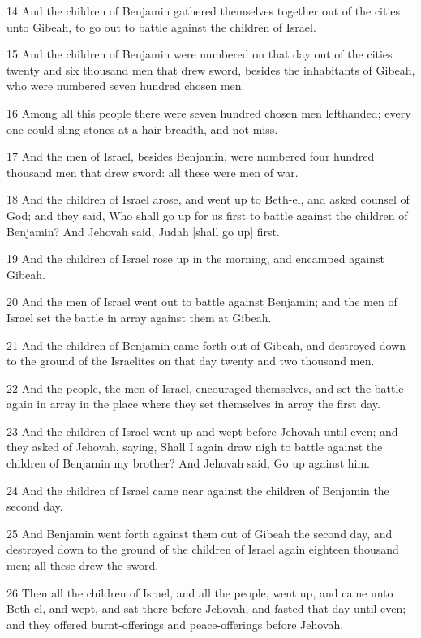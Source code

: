 \par 14 And the children of Benjamin gathered themselves together out of the cities unto Gibeah, to go out to battle against the children of Israel.
\par 15 And the children of Benjamin were numbered on that day out of the cities twenty and six thousand men that drew sword, besides the inhabitants of Gibeah, who were numbered seven hundred chosen men.
\par 16 Among all this people there were seven hundred chosen men lefthanded; every one could sling stones at a hair-breadth, and not miss.
\par 17 And the men of Israel, besides Benjamin, were numbered four hundred thousand men that drew sword: all these were men of war.
\par 18 And the children of Israel arose, and went up to Beth-el, and asked counsel of God; and they said, Who shall go up for us first to battle against the children of Benjamin? And Jehovah said, Judah [shall go up] first.
\par 19 And the children of Israel rose up in the morning, and encamped against Gibeah.
\par 20 And the men of Israel went out to battle against Benjamin; and the men of Israel set the battle in array against them at Gibeah.
\par 21 And the children of Benjamin came forth out of Gibeah, and destroyed down to the ground of the Israelites on that day twenty and two thousand men.
\par 22 And the people, the men of Israel, encouraged themselves, and set the battle again in array in the place where they set themselves in array the first day.
\par 23 And the children of Israel went up and wept before Jehovah until even; and they asked of Jehovah, saying, Shall I again draw nigh to battle against the children of Benjamin my brother? And Jehovah said, Go up against him.
\par 24 And the children of Israel came near against the children of Benjamin the second day.
\par 25 And Benjamin went forth against them out of Gibeah the second day, and destroyed down to the ground of the children of Israel again eighteen thousand men; all these drew the sword.
\par 26 Then all the children of Israel, and all the people, went up, and came unto Beth-el, and wept, and sat there before Jehovah, and fasted that day until even; and they offered burnt-offerings and peace-offerings before Jehovah.
